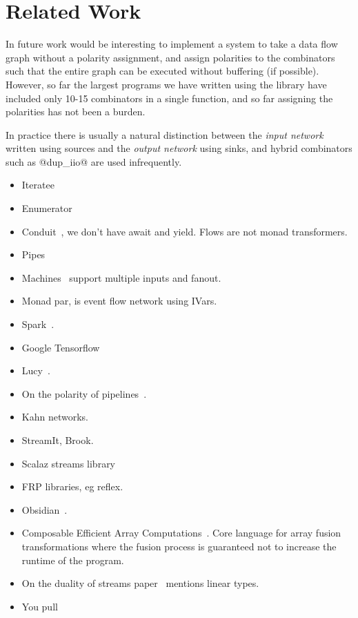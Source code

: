 \section{Related Work}

In future work would be interesting to implement a system to take a data flow graph without a polarity assignment, and assign polarities to the combinators such that the entire graph can be executed without buffering (if possible). However, so far the largest programs we have written using the library have included only 10-15 combinators in a single function, and so far assigning the polarities has not been a burden. 

In practice there is usually a natural distinction between the \emph{input network} written using sources and the \emph{output network} using sinks, and hybrid combinators such as @dup_iio@ are used infrequently.

\begin{itemize}
\item Iteratee~\cite{Kiselyov:iteratee}
\item Enumerator~\cite{hackage:enumerator}
\item Conduit~\cite{hackage:conduit}, we don't have await and yield. Flows are not monad transformers.
\item Pipes~\cite{hackage:pipes}
\item Machines~\cite{hackage:machines} support multiple inputs and fanout.
\item Monad par, is event flow network using IVars.
\item Spark~\cite{Zaharia:RDDs}.
\item Google Tensorflow
\item Lucy~\cite{Mandel:Lucy}.
\item On the polarity of pipelines~\cite{Kay:YouPull}.
\item Kahn networks.
\item StreamIt, Brook.
\item Scalaz streams library~\cite{github:scalaz-streams}
\item FRP libraries, eg reflex.
\item Obsidian~\cite{Claessen:ExpressiveArray}.
\item Composable Efficient Array Computations~\cite{Bernardy:Composable}. Core language for array fusion transformations where the fusion process is guaranteed not to increase the runtime of the program. 
\item On the duality of streams paper~\cite{Bernardy:Duality} mentions linear types.
\item You pull~\cite{Kay:YouPull}
\end{itemize}



